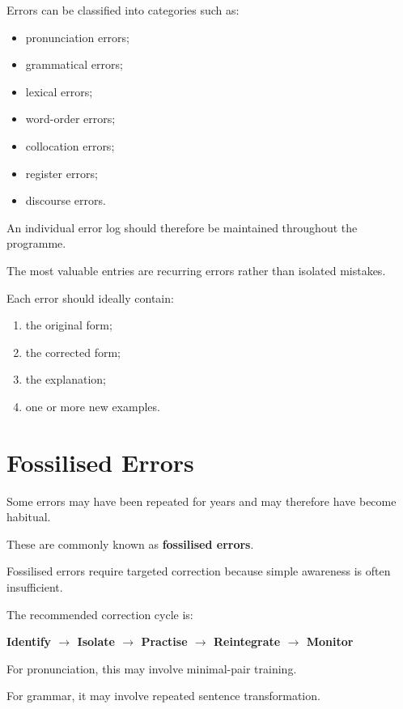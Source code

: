 Errors can be classified into categories such as:

\begin{itemize}
    \item pronunciation errors;
    \item grammatical errors;
    \item lexical errors;
    \item word-order errors;
    \item collocation errors;
    \item register errors;
    \item discourse errors.
\end{itemize}

An individual error log should therefore be maintained throughout the programme.

The most valuable entries are recurring errors rather than isolated mistakes.

Each error should ideally contain:

\begin{enumerate}
    \item the original form;
    \item the corrected form;
    \item the explanation;
    \item one or more new examples.
\end{enumerate}

\section*{Fossilised Errors}

Some errors may have been repeated for years and may therefore have become habitual.

These are commonly known as \textbf{fossilised errors}.

Fossilised errors require targeted correction because simple awareness is often insufficient.

The recommended correction cycle is:

\begin{center}
\textbf{Identify $\rightarrow$ Isolate $\rightarrow$ Practise $\rightarrow$ Reintegrate $\rightarrow$ Monitor}
\end{center}

For pronunciation, this may involve minimal-pair training.

For grammar, it may involve repeated sentence transformation.

